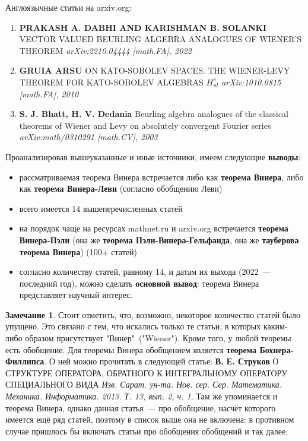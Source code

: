 \documentclass[12pt]{extarticle}
\theoremstyle{definition}
\newtheorem*{remark}{\indent Замечание}
\begin{document}
  	Англоязычные статьи на arxiv.org:
  	\begin{enumerate}
		\item \textbf{PRAKASH A. DABHI AND KARISHMAN B. SOLANKI} VECTOR VALUED BEURLING ALGEBRA ANALOGUES OF
		WIENER’S THEOREM \textit{arXiv:2210.04444 [math.FA], 2022}
		\item \textbf{GRUIA ARSU} ON KATO-SOBOLEV SPACES. THE WIENER-LEVY THEOREM FOR KATO-SOBOLEV ALGEBRAS $H^s_{ul}$ \textit{arXiv:1010.0815 [math.FA], 2010}
		\item \textbf{S. J. Bhatt, H. V. Dedania} Beurling algebra analogues of the classical theorems of Wiener and Levy on absolutely convergent Fourier series \textit{	arXiv:math/0310291 [math.CV], 2003}
  	\end{enumerate}

  	Проанализировав вышеуказанные и иные источники, имеем следующие \textbf{выводы}:
 	\begin{itemize}
		\item рассматриваемая теорема Винера встречается либо как \textbf{теорема Винера}, либо как \textbf{теорема Винера-Леви} (согласно обобщению Леви)
		\item всего имеется 14 вышеперечисленных статей
		\item на порядок чаще на ресурсах mathnet.ru и arxiv.org встречается \textbf{теорема Винера-Пэли} (она же \textbf{теорема Пэли-Винера-Гельфанда}, она же \textbf{тауберова теорема Винера}) (100+ статей)
		\item согласно количеству статей, равному 14, и датам их выхода (2022~--- последний год), можно сделать \textbf{основной вывод}: теорема Винера представляет научный интерес.
	\end{itemize}
  	\begin{remark}
          Стоит отметить, что, возможно, некоторое количество статей было упущено. Это связано с тем, что искались только те статьи, в которых каким-либо образом присутствует "Винер"\ ("Wiener"). Кроме того, у любой теоремы есть обобщение. Для теоремы Винера обобщением является \textbf{теорема Бохнера-Филлипса}. О ней можно прочитать в следующей статье: \textbf{В. Е. Струков} О СТРУКТУРЕ ОПЕРАТОРА, ОБРАТНОГО К ИНТЕГРАЛЬНОМУ ОПЕРАТОРУ СПЕЦИАЛЬНОГО ВИДА \textit{Изв. Сарат. ун-та. Нов. сер. Сер. Математика. Механика. Информатика. 2013. Т. 13, вып. 2, ч. 1}. Там же упоминается и теорема Винера, однако данная статья~--- про обобщение, насчёт которого имеется ещё ряд статей, поэтому в список выше она не включена: в противном случае пришлось бы включать статьи про обобщения обобщений и так далее.
      \end{remark}
\end{document}

